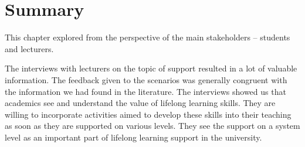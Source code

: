
\section{Summary}

This chapter explored \LLLs from the perspective of the main stakeholders --
students and lecturers.

The interviews with lecturers on the topic of \LLLs support resulted in a lot
of valuable information. The feedback given to the scenarios was generally
congruent with the information we had found in the literature. The interviews
showed us that academics see and understand the value of lifelong learning
skills. They are willing to incorporate activities aimed to develop these skills
into their teaching as soon as they are supported on various levels. They see
the support on a system level as an important part of lifelong learning support
in the university.
